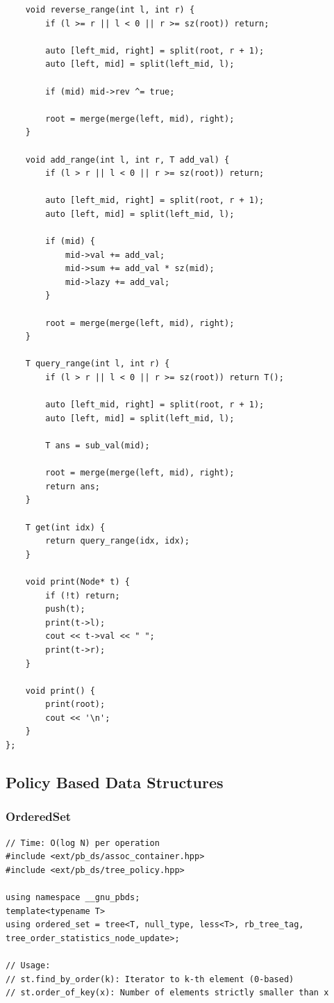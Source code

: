 \documentclass[9pt,a4paper,twocolumn]{extarticle}
\begin{document}
\begin{lstlisting}
    void reverse_range(int l, int r) {
        if (l >= r || l < 0 || r >= sz(root)) return;

        auto [left_mid, right] = split(root, r + 1);
        auto [left, mid] = split(left_mid, l);

        if (mid) mid->rev ^= true;

        root = merge(merge(left, mid), right);
    }

    void add_range(int l, int r, T add_val) {
        if (l > r || l < 0 || r >= sz(root)) return;
        
        auto [left_mid, right] = split(root, r + 1);
        auto [left, mid] = split(left_mid, l);
        
        if (mid) {
            mid->val += add_val;
            mid->sum += add_val * sz(mid);
            mid->lazy += add_val;
        }
        
        root = merge(merge(left, mid), right);
    }

    T query_range(int l, int r) {
        if (l > r || l < 0 || r >= sz(root)) return T();

        auto [left_mid, right] = split(root, r + 1);
        auto [left, mid] = split(left_mid, l);

        T ans = sub_val(mid);

        root = merge(merge(left, mid), right);
        return ans;
    }

    T get(int idx) {
        return query_range(idx, idx);
    }

    void print(Node* t) {
        if (!t) return;
        push(t);
        print(t->l);
        cout << t->val << " ";
        print(t->r);
    }

    void print() {
        print(root);
        cout << '\n';
    }
};
\end{lstlisting}

\subsection{Policy Based Data Structures}

\filbreak
\subsubsection{OrderedSet}
\nopagebreak
\begin{lstlisting}
// Time: O(log N) per operation
#include <ext/pb_ds/assoc_container.hpp>
#include <ext/pb_ds/tree_policy.hpp>

using namespace __gnu_pbds;
template<typename T>
using ordered_set = tree<T, null_type, less<T>, rb_tree_tag, tree_order_statistics_node_update>;

// Usage:
// st.find_by_order(k): Iterator to k-th element (0-based)
// st.order_of_key(x): Number of elements strictly smaller than x
\end{lstlisting}
\end{document}
